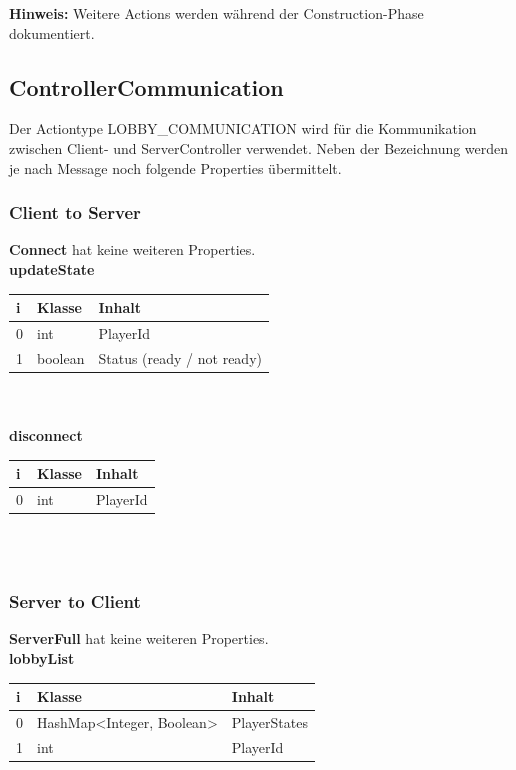 \documentclass[11pt]{scrartcl}
\begin{document}
\textbf{Hinweis: } Weitere Actions werden während der Construction-Phase dokumentiert.

\newpage

\subsection{ControllerCommunication}
Der Actiontype LOBBY\_COMMUNICATION wird für die Kommunikation zwischen Client- und ServerController verwendet. Neben der Bezeichnung werden je nach Message noch folgende Properties übermittelt.\\

\subsubsection{Client to Server}

\textbf{Connect} hat keine weiteren Properties.\\

\textbf{updateState}\\

\begin{tabularx}{\linewidth}{l l l}
	\textbf{i} & \textbf{Klasse} & \textbf{Inhalt}\\
	\hline
	0 & int & PlayerId\\
	1 & boolean & Status (ready / not ready)\\
\end{tabularx}\\\\

\textbf{disconnect}\\

\begin{tabularx}{\linewidth}{l l l}
	\textbf{i} & \textbf{Klasse} & \textbf{Inhalt}\\
	\hline
	0 & int & PlayerId\\
\end{tabularx}\\\\


\subsubsection{Server to Client}
\textbf{ServerFull} hat keine weiteren Properties.\\

\textbf{lobbyList}\\

\begin{tabularx}{\linewidth}{l l l}
	\textbf{i} & \textbf{Klasse} & \textbf{Inhalt}\\
	\hline
	0 & HashMap<Integer, Boolean> & PlayerStates\\
	1 & int & PlayerId\\
\end{tabularx}\\\\
\end{document}
